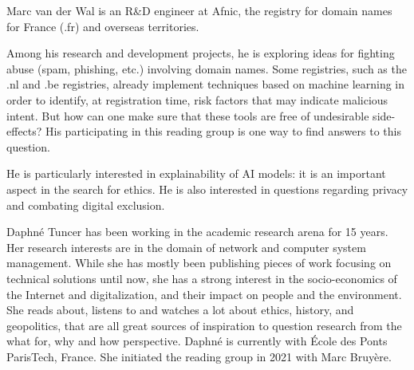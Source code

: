 \documentclass[journal]{IEEEtran}
\begin{document}
 

\begin{IEEEbiographynophoto}{Marc van der Wal}
is an R\&D engineer at Afnic, the registry for domain
names for France (.fr) and overseas territories.

Among his research and development projects, he is exploring ideas for
fighting  abuse (spam,  phishing, etc.)  involving domain  names. Some
registries,  such as  the .nl  and .be  registries, already  implement
techniques  based  on  machine  learning  in  order  to  identify,  at
registration   time,  risk   factors  that   may  indicate   malicious
intent.  But how  can  one make  sure  that these  tools  are free  of
undesirable side-effects?  His participating in this  reading group is
one way to find answers to this question.

He is particularly interested in explainability of AI models: it is an
important aspect  in the search for  ethics. He is also  interested in
questions regarding privacy and combating digital exclusion.
\end{IEEEbiographynophoto}

\begin{IEEEbiographynophoto}{Daphné Tuncer}
has  been  working  in  the academic  research  arena  for  15
years.  Her  research interests  are  in  the  domain of  network  and
computer  system  management. While  she  has  mostly been  publishing
pieces of  work focusing on technical  solutions until now, she  has a
strong   interest  in   the  socio-economics   of  the   Internet  and
digitalization, and  their impact on  people and the  environment. She
reads about, listens  to and watches a lot about  ethics, history, and
geopolitics, that  are all  great sources  of inspiration  to question
research  from  the what  for,  why  and  how perspective.  Daphné  is
currently with  École des Ponts  ParisTech, France. She  initiated the
reading group in 2021 with Marc Bruyère.
\end{IEEEbiographynophoto}
\end{document}
